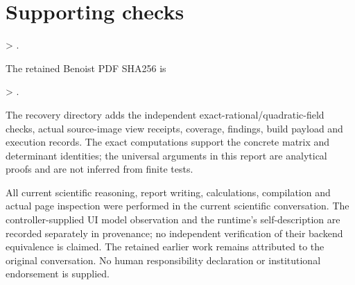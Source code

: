 \documentclass[10pt]{article}
\begin{document}
\section*{Supporting checks}
> .\par
The retained Benoist PDF SHA256 is\par
> .\par
The recovery directory adds the independent exact-rational/quadratic-field checks, actual source-image view receipts, coverage, findings, build payload and execution records. The exact computations support the concrete matrix and determinant identities; the universal arguments in this report are analytical proofs and are not inferred from finite tests.\par
All current scientific reasoning, report writing, calculations, compilation and actual page inspection were performed in the current scientific conversation. The controller-supplied UI model observation and the runtime’s self-description are recorded separately in provenance; no independent verification of their backend equivalence is claimed. The retained earlier work remains attributed to the original conversation. No human responsibility declaration or institutional endorsement is supplied.\par
\end{document}
